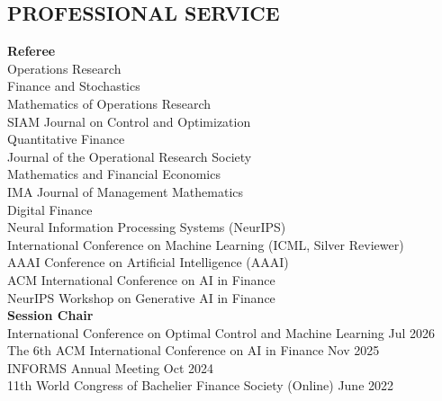 \documentclass[margin, 10pt]{res} %
\begin{document}
\begin{resume}
\section{PROFESSIONAL SERVICE}

\textbf{Referee}\\
Operations Research\\
Finance and Stochastics\\
Mathematics of Operations Research\\
SIAM Journal on Control and Optimization\\
Quantitative Finance\\
Journal of the Operational Research Society\\
Mathematics and Financial Economics\\
IMA Journal of Management Mathematics\\
Digital Finance\\
Neural Information Processing Systems (NeurIPS)\\
International Conference on Machine Learning (ICML, Silver Reviewer)\\
AAAI Conference on Artificial Intelligence (AAAI)\\
ACM International Conference on AI in Finance\\
NeurIPS Workshop on Generative AI in Finance\\


\textbf{Session Chair}\\
International Conference on Optimal Control and Machine Learning \hfill Jul 2026\\
The 6th ACM International Conference on AI in Finance \hfill Nov 2025\\
INFORMS Annual Meeting \hfill Oct 2024\\
11th World Congress of Bachelier Finance Society (Online) \hfill June 2022\\






\end{resume}
\end{document}
